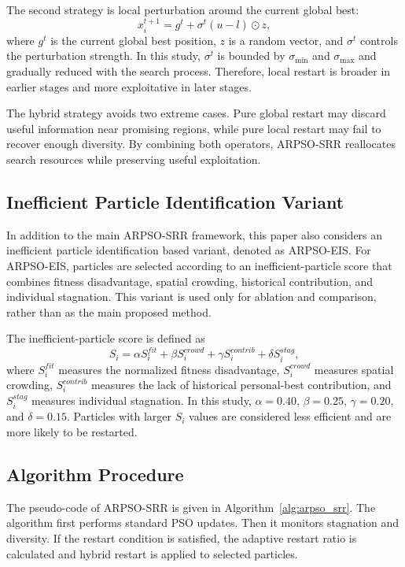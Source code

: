 \documentclass[conference]{IEEEtran}
\begin{document}
The second strategy is local perturbation around the current global best:
\begin{equation}
    x_i^{t+1}=g^t+\sigma^t (u-l)\odot z,
    \label{eq:local_restart}
\end{equation}
where $g^t$ is the current global best position, $z$ is a random vector, and $\sigma^t$ controls the perturbation strength. In this study, $\sigma^t$ is bounded by $\sigma_{\min}$ and $\sigma_{\max}$ and gradually reduced with the search process. Therefore, local restart is broader in earlier stages and more exploitative in later stages.

The hybrid strategy avoids two extreme cases. Pure global restart may discard useful information near promising regions, while pure local restart may fail to recover enough diversity. By combining both operators, ARPSO-SRR reallocates search resources while preserving useful exploitation.

\subsection{Inefficient Particle Identification Variant}
In addition to the main ARPSO-SRR framework, this paper also considers an inefficient particle identification based variant, denoted as ARPSO-EIS. For ARPSO-EIS, particles are selected according to an inefficient-particle score that combines fitness disadvantage, spatial crowding, historical contribution, and individual stagnation. This variant is used only for ablation and comparison, rather than as the main proposed method.

The inefficient-particle score is defined as
\begin{equation}
    S_i=\alpha S_i^{fit}+\beta S_i^{crowd}+\gamma S_i^{contrib}+\delta S_i^{stag},
    \label{eq:eis_score}
\end{equation}
where $S_i^{fit}$ measures the normalized fitness disadvantage, $S_i^{crowd}$ measures spatial crowding, $S_i^{contrib}$ measures the lack of historical personal-best contribution, and $S_i^{stag}$ measures individual stagnation. In this study, $\alpha=0.40$, $\beta=0.25$, $\gamma=0.20$, and $\delta=0.15$. Particles with larger $S_i$ values are considered less efficient and are more likely to be restarted.

\subsection{Algorithm Procedure}
The pseudo-code of ARPSO-SRR is given in Algorithm~\ref{alg:arpso_srr}. The algorithm first performs standard PSO updates. Then it monitors stagnation and diversity. If the restart condition is satisfied, the adaptive restart ratio is calculated and hybrid restart is applied to selected particles.
\end{document}
